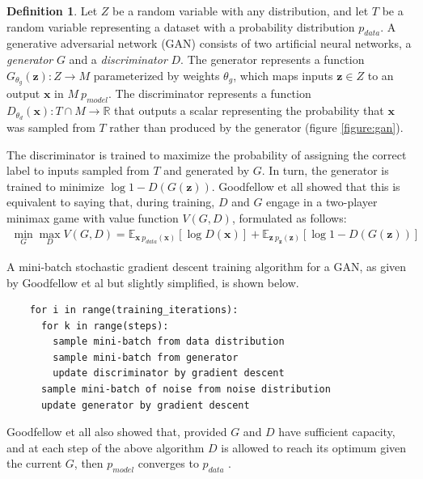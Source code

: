 \documentclass[12pt, titlepage]{report}
\theoremstyle{definition}
\newtheorem{definition}{Definition}
\begin{document}
\begin{definition}
Let $Z$ be a random variable with any distribution, and let $T$ be a random variable representing a dataset with a probability distribution $p_{data}$. A generative adversarial network (GAN) consists of two artificial neural networks, a \emph{generator} $G$ and a \emph{discriminator} $D$. The generator represents a function $G_{\theta_{g}}(\bm{z}) : Z \rightarrow M$ parameterized by weights $\theta_g$, which maps inputs $\bm{z} \in Z$ to an output $\bm{x}$ in $M ~ p_{model}$. The discriminator represents a function $D_{\theta_d}(\bm{x}) : T \cap M \rightarrow \mathbb{R}$ that outputs a scalar representing the probability that $\bm{x}$ was sampled from $T$ rather than produced by the generator (figure \ref{figure:gan}).

The discriminator is trained to maximize the probability of assigning the correct label to inputs sampled from $T$ and generated by $G$. In turn, the generator is trained to minimize $\log{1 - D(G(\bm{z}))}$. Goodfellow et all \cite[p. 3]{goodfellow2014generative} showed that this is equivalent to saying that, during training, $D$ and $G$ engage in a two-player minimax game with value function $V(G, D)$, formulated as follows:
\begin{gather}\label{eq:gan_train}
\min_G{\max_D{V(G, D)}} = \mathbb{E}_{\bm{x}~p_{data}(\bm{x})}[\log{D(\bm{x})}] + \mathbb{E}_{\bm{z}~p_{\bm{z}}(\bm{z})}[\log{1 - D(G(\bm{z}))}]
\end{gather}
\end{definition}

A mini-batch stochastic gradient descent training algorithm for a GAN, as given by Goodfellow et al but slightly simplified, is shown below.
\begin{verbatim}
    for i in range(training_iterations):
      for k in range(steps):
        sample mini-batch from data distribution
        sample mini-batch from generator
        update discriminator by gradient descent
      sample mini-batch of noise from noise distribution
      update generator by gradient descent
\end{verbatim}
Goodfellow et all also showed that, provided $G$ and $D$ have sufficient capacity, and at each step of the above algorithm $D$ is allowed to reach its optimum given the current $G$, then $p_{model}$ converges to $p_{data}$ \cite[p. 5]{goodfellow2014generative}.
\end{document}
